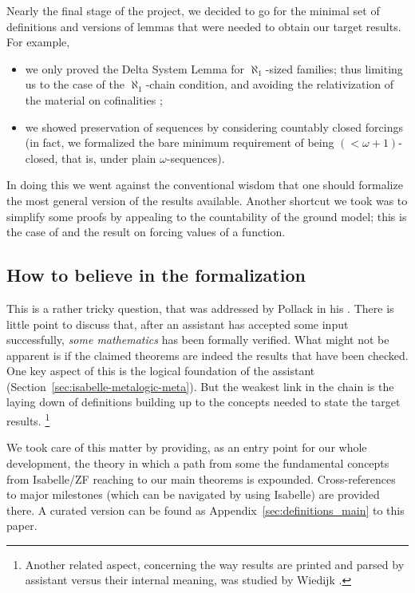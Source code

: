Nearly the final stage of the project, we decided to go for the minimal
set of definitions and versions of lemmas that were needed to obtain
our target results. For example,
\begin{itemize}
\item
  we only proved the Delta System Lemma for $\aleph_1$-sized families;
  thus limiting us to the case of the $\aleph_1$-chain condition, and avoiding the relativization
  of the material on cofinalities \cite{Delta_System_Lemma-AFP};
\item we showed preservation of sequences by considering countably
  closed forcings (in fact, we formalized the bare minimum requirement
  of being $(<\omega+1)$-closed, that is, under plain $\omega$-sequences).
\end{itemize}
In doing this we went against the conventional wisdom that one should formalize the most general version of the
results available. Another shortcut we took was to
simplify some proofs by appealing to the countability of the ground
model; this is the case of
 and the result on forcing
values of a function.

\subsection{How to believe in the formalization}
\label{sec:how-believe-formalization}

This is a rather tricky question, that was addressed by Pollack in his
\cite{MR1686867}. There is little point to discuss that, after an
assistant has accepted some input successfully, \emph{some
mathematics} has been formally verified. What might not be apparent is
if the claimed theorems are indeed the results that have been
checked. One key aspect of this is the logical foundation of the
assistant (Section~\ref{sec:isabelle-metalogic-meta}). But the weakest
link in the chain is the laying down of definitions building up to the
concepts needed to state the target results.%
\footnote{%
Another related aspect,
concerning the way results are printed and parsed by assistant versus
their internal meaning, was studied by Wiedijk \cite{zbMATH06319597}.}

We took care of this matter by providing, as an entry point for our
whole development, the theory  in which a
path from some the fundamental concepts from Isabelle/ZF reaching to our main theorems
is expounded. Cross-references to major milestones (which can be
navigated by using Isabelle) are provided there. A curated version can
be found as Appendix~\ref{sec:definitions_main} to this paper.

